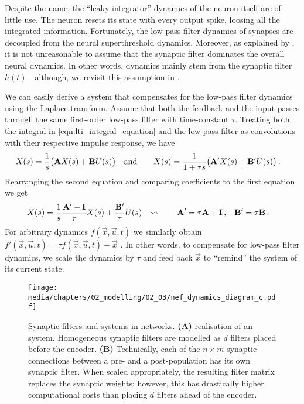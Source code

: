 Despite the name, the \enquote{leaky integrator} dynamics of the \LIF neuron itself are of little use.
The neuron resets its state with every output spike, loosing all the integrated information.
Fortunately, the low-pass filter dynamics of synapses are decoupled from the neural superthreshold dynamics.
Moreover, as explained by
\citet[Chapter~8 \& Appendix~F.1]{eliasmith2003neural},
it is not unreasonable to assume that the synaptic filter dominates the overall neural dynamics.
In other words, dynamics mainly stem from the synaptic filter $h(t)$---although, we revisit this assumption in .

We can easily derive a system that compensates for the low-pass filter dynamics using the Laplace transform.
Assume that both the feedback and the input passes through the same first-order low-pass filter with time-constant $\tau$.
Treating both the integral in \cref{eqn:lti_integral_equation} and the low-pass filter as convolutions with their respective impulse response, we have
\begin{align}
	X(s) &= \frac{1}{s} \bigl( \mathbf{A} X(s) + \mathbf{B} U(s) \bigr) & \text{and} \quad\quad X(s) &= \frac{1}{1 + \tau s} \bigl( \mathbf{A}' X(s) + \mathbf{B}' U(s) \bigr) \,.
	\label{eqn:original_vs_modified_lti}
\end{align}
Rearranging the second equation and comparing coefficients to the first equation we get
\begin{align}
	X(s) &= \frac{1}{s} \frac{\mathbf{A}' - \mathbf{I}}{\tau} X(s) + \frac{\mathbf{B}'}{\tau} U(s) &
	\leadsto \quad \quad \mathbf{A}' &= \tau \mathbf{A} + \mathbf{I} \,, &
	\mathbf{B}' &= \tau \mathbf{B} \,.
	\label{eqn:nef_transform_a_b}
\end{align}
For arbitrary dynamics $f(\vec x, \vec u, t)$ we similarly obtain $f'(\vec x, \vec u, t) = \tau f(\vec x, \vec u, t) + \vec x$ \citep[Chapter~8]{eliasmith2003neural}.
In other words, to compensate for low-pass filter dynamics, we scale the dynamics by $\tau$ and feed back $\vec x$ to \enquote{remind} the system of its current state.

\begin{figure}
	\centering
	\texttt{[image: media/chapters/02\_modelling/02\_03/nef\_dynamics\_diagram\_c.pdf]}%
	{\label{fig:nef_dynamics_neurons_a}}%
	{\label{fig:nef_dynamics_neurons_b}}%
	\caption[Synaptic filters and LTI systems in NEF networks]{Synaptic filters and \LTI systems in \NEF networks.
	\textbf{(A)} \NEF realisation of an \LTI system. Homogeneous synaptic filters are modelled as $d$ filters placed before the encoder.
	\textbf{(B)} Technically, each of the $n \times m$ synaptic connections between a pre- and a post-population has its own synaptic filter. When scaled appropriately, the resulting filter matrix replaces the synaptic weights; however, this has drastically higher computational costs than placing $d$ filters ahead of the encoder.}
	\label{fig:nef_dynamics_neurons}
\end{figure}

